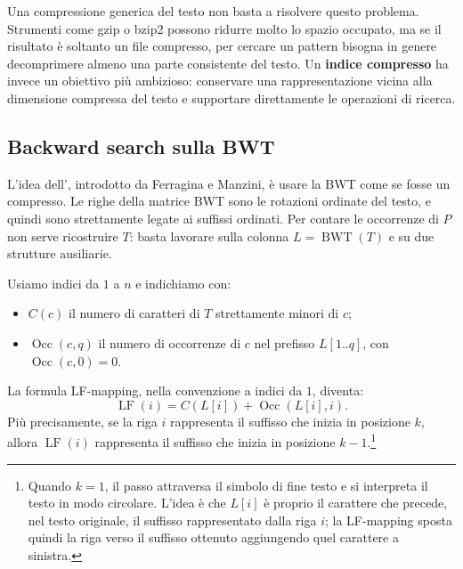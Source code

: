 \documentclass{article}
\theoremstyle{definition}
\numberwithin{equation}{section}
\begin{document}
Una compressione generica del testo non basta a risolvere questo problema. Strumenti come gzip o bzip2 possono ridurre molto lo spazio occupato, ma se il risultato è soltanto un file compresso, per cercare un pattern bisogna in genere decomprimere almeno una parte consistente del testo. Un \textbf{indice compresso} ha invece un obiettivo più ambizioso: conservare una rappresentazione vicina alla dimensione compressa del testo e supportare direttamente le operazioni di ricerca.

\subsection{Backward search sulla BWT}
L'idea dell'\textbf{}, introdotto da Ferragina e Manzini, è usare la BWT come se fosse un  compresso. Le righe della matrice BWT sono le rotazioni ordinate del testo, e quindi sono strettamente legate ai suffissi ordinati. Per contare le occorrenze di $P$ non serve ricostruire $T$: basta lavorare sulla colonna $L=\operatorname{BWT}(T)$ e su due strutture ausiliarie.

Usiamo indici da $1$ a $n$ e indichiamo con:
\begin{itemize}
    \item $C(c)$ il numero di caratteri di $T$ strettamente minori di $c$;
    \item $\operatorname{Occ}(c,q)$ il numero di occorrenze di $c$ nel prefisso $L[1..q]$, con $\operatorname{Occ}(c,0)=0$.
\end{itemize}

La formula LF-mapping, nella convenzione a indici da $1$, diventa:
\[
    \operatorname{LF}(i)
    =
    C(L[i])+\operatorname{Occ}(L[i],i).
\]
Più precisamente, se la riga $i$ rappresenta il suffisso che inizia in posizione $k$, allora $\operatorname{LF}(i)$ rappresenta il suffisso che inizia in posizione $k-1$.\footnote{Quando $k=1$, il passo attraversa il simbolo di fine testo e si interpreta il testo in modo circolare. L'idea è che $L[i]$ è proprio il carattere che precede, nel testo originale, il suffisso rappresentato dalla riga $i$; la LF-mapping sposta quindi la riga verso il suffisso ottenuto aggiungendo quel carattere a sinistra.}
\end{document}
